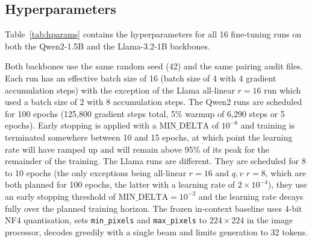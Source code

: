 \documentclass[12pt]{report}
\begin{document}
\subsection{Hyperparameters}
Table~\ref{tab:hparams} contains the hyperparameters for all 16 fine-tuning runs on both the Qwen2-1.5B and the Llama-3.2-1B backbones.

Both backbones use the same random seed (42) and the same pairing audit files. Each run has an effective batch size of 16 (batch size of 4 with 4 gradient accumulation steps) with the exception of the Llama all-linear $r{=}16$ run which used a batch size of 2 with 8 accumulation steps. The Qwen2 runs are scheduled for 100 epochs (125,800 gradient steps total, 5\% warmup of 6,290 steps or 5 epochs). Early stopping is applied with a $\text{MIN\_DELTA}$ of $10^{-8}$ and training is terminated somewhere between 10 and 15 epochs, at which point the learning rate will have ramped up and will remain above 95\% of its peak for the remainder of the training. The Llama runs are different. They are scheduled for 8 to 10 epochs (the only exceptions being all-linear $r{=}16$ and $q,v$ $r{=}8$, which are both planned for 100 epochs, the latter with a learning rate of $2\times 10^{-4}$), they use an early stopping threshold of $\text{MIN\_DELTA} = 10^{-3}$ and the learning rate decays fully over the planned training horizon. The frozen in-context baseline uses 4-bit NF4 quantisation, sets \texttt{min\_pixels} and \texttt{max\_pixels} to $224 \times 224$ in the image processor, decodes greedily with a single beam and limits generation to 32 tokens.
\end{document}
